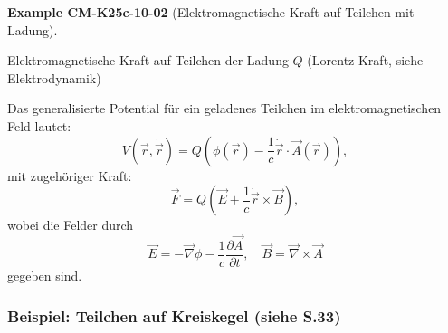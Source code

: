 \documentclass[10pt, letterpaper]{article}
\newcommand{\CustomHeading}[3]{%
  \par\medskip\noindent%
  \textbf{#1 #2} \textnormal{(#3)}.\enskip%
}
\newenvironment{EXA}[2]{\begin{unitbox}\CustomHeading{Example}{#1}{#2}}{\end{unitbox}}
\begin{document}
\begin{EXA}{CM-K25c-10-02}{Elektromagnetische Kraft auf Teilchen mit Ladung}
Elektromagnetische Kraft auf Teilchen der Ladung $Q$ (Lorentz-Kraft, siehe Elektrodynamik)

Das generalisierte Potential für ein geladenes Teilchen im elektromagnetischen Feld lautet:
\[
V(\vec{r}, \dot{\vec{r}}) = Q \left( \phi(\vec{r}) - \frac{1}{c} \dot{\vec{r}} \cdot \vec{A}(\vec{r}) \right),
\]
mit zugehöriger Kraft:
\[
\vec{F} = Q \left( \vec{E} + \frac{1}{c} \dot{\vec{r}} \times \vec{B} \right),
\]
wobei die Felder durch
\[
\vec{E} = -\vec{\nabla} \phi - \frac{1}{c} \frac{\partial \vec{A}}{\partial t}, 
\quad 
\vec{B} = \vec{\nabla} \times \vec{A}
\]
gegeben sind.

\vspace{1em}
\end{EXA}






\subsubsection{Beispiel: Teilchen auf Kreiskegel (siehe S.33)}


\end{document}
